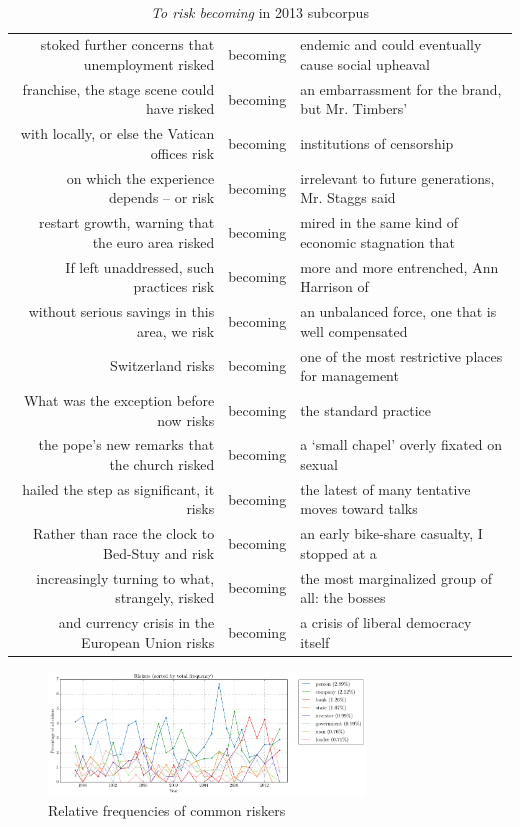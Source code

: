     \begin{table}
    \
    \footnotesize
    \
    \begin{tabular}{rcl}
    stoked further concerns that unemployment risked &  becoming &  endemic and could eventually cause social upheaval  \\ 
    franchise, the stage scene could have risked &  becoming &  an embarrassment for the brand, but Mr. Timbers'   \\ 
    with locally, or else the Vatican offices risk &  becoming &  institutions of censorship   \\ 
    on which the experience depends -- or risk &  becoming &  irrelevant to future generations, Mr. Staggs said   \\ 
    restart growth, warning that the euro area risked &  becoming &  mired in the same kind of economic stagnation that   \\ 
    If left unaddressed, such practices risk &  becoming &  more and more entrenched, Ann Harrison of   \\ 
    without serious savings in this area, we risk &  becoming &  an unbalanced force, one that is well compensated   \\ 
    Switzerland risks &  becoming &  one of the most restrictive places for management   \\ 
    What was the exception before now risks &  becoming &  the standard practice   \\ 
    the pope's new remarks that the church risked &  becoming &  a `small chapel' overly fixated on sexual   \\ 
    hailed the step as significant, it risks &  becoming &  the latest of many tentative moves toward talks   \\ 
    Rather than race the clock to Bed-Stuy and risk &  becoming &  an early bike-share casualty, I stopped at a   \\ 
    increasingly turning to what, strangely, risked &  becoming &  the most marginalized group of all: the bosses   \\ 
    and currency crisis in the European Union risks &  becoming &  a crisis of liberal democracy itself \\ 
    \end{tabular}
    \caption{\emph{To risk becoming} in 2013 subcorpus}
    \label{conc:riskbecoming}
    \end{table}

    \begin{figure}[htb!]
    \centering
    \includegraphics[width=0.75\textwidth]{../images/riskers-sorted-by-total-frequency.png}
    \caption{Relative frequencies of common riskers}
    \label{fig:riskers}
    \end{figure}

